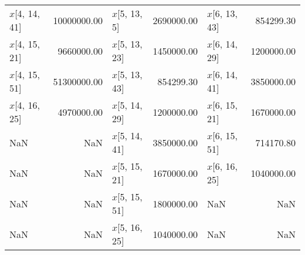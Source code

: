 \begin{longtable}{lrlrlr}
$x$[4, 14, 41] & 10000000.00 & $x$[5, 13, 5] & 2690000.00 & $x$[6, 13, 43] & 854299.30 \\
$x$[4, 15, 21] & 9660000.00 & $x$[5, 13, 23] & 1450000.00 & $x$[6, 14, 29] & 1200000.00 \\
$x$[4, 15, 51] & 51300000.00 & $x$[5, 13, 43] & 854299.30 & $x$[6, 14, 41] & 3850000.00 \\
$x$[4, 16, 25] & 4970000.00 & $x$[5, 14, 29] & 1200000.00 & $x$[6, 15, 21] & 1670000.00 \\
NaN & NaN & $x$[5, 14, 41] & 3850000.00 & $x$[6, 15, 51] & 714170.80 \\
NaN & NaN & $x$[5, 15, 21] & 1670000.00 & $x$[6, 16, 25] & 1040000.00 \\
NaN & NaN & $x$[5, 15, 51] & 1800000.00 & NaN & NaN \\
NaN & NaN & $x$[5, 16, 25] & 1040000.00 & NaN & NaN \\
\end{longtable}
